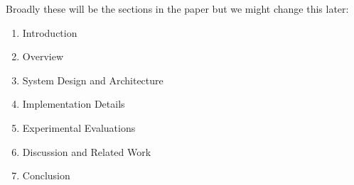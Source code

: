 Broadly these will be the sections in the paper but we might change this later:
\begin{enumerate}
	\item Introduction
	\item Overview
	\item System Design and Architecture
	\item Implementation Details
	\item Experimental Evaluations
	\item Discussion and Related Work
	\item Conclusion
\end{enumerate}